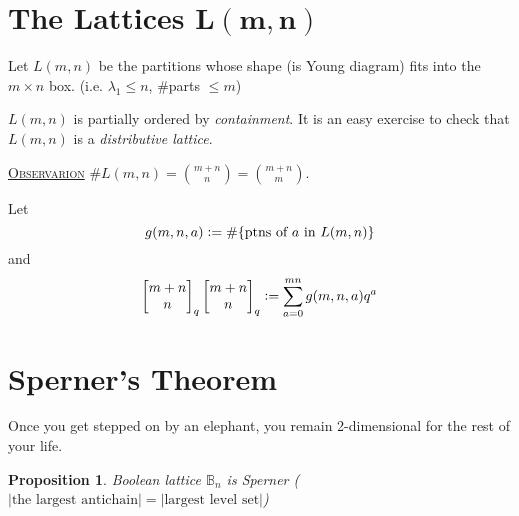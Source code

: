 \documentclass{report}
\newcommand{\qbin}[2]{\begin{bmatrix}{#1}\\ {#2}\end{bmatrix}_q}
\newcommand{\defeq}{\vcentcolon=}
\newcommand{\fancyem}[1]{\underline{\textsc{#1}}}
\newtheorem{proposition}{Proposition}[section]
\theoremstyle{definition}
\theoremstyle{remark}
\numberwithin{equation}{section}
\newcommand*\ttlmath[2]{\texorpdfstring{$\boldsymbol{#1}$}{#2}}
\begin{document}
\section{The Lattices \ttlmath{L(m, n)}{L(m, n)}}
Let $L(m, n)$ be the partitions whose shape (is Young diagram) fits into the $m \times n$ box. (i.e. $\lambda_1 \leq n$, $\#$parts $\leq m$)

$L(m, n)$ is partially ordered by \emph{containment}.
It is an easy exercise to check that $L(m, n)$ is a \emph{distributive lattice}.

\fancyem{Observarion} $\#L(m, n) = \binom{m+n}{n} = \binom{m + n}{m}$.

Let \[g(m, n, a) \defeq \#\{\text{ptns of $a$ in $L(m, n)$}\}\] and \[
    \begin{bmatrix}
        m + n \\ n
    \end{bmatrix}_q \qbin{m+n}{n} \defeq \sum_{a = 0}^{mn} g(m, n, a)q^a    
\]


\section{Sperner's Theorem}
\epigraph{Once you get stepped on by an elephant, you remain 2-dimensional for the rest of your life.}{}
\begin{proposition}
    Boolean lattice $\mathbb{B}_n$ is Sperner ($|\text{the largest antichain}| = |\text{largest level set}|$)
\end{proposition}
\end{document}
